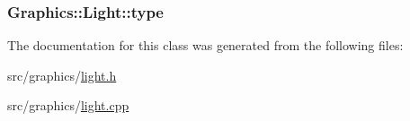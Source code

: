 \subsubsection[{type}]{ Graphics\+::\+Light\+::type\hspace{0.3cm}{\ttfamily [private]}}\label{class_graphics_1_1_light_a91b3331f89b6e025dfecfdc441a7080f}


The documentation for this class was generated from the following files\+:\begin{DoxyCompactItemize}
\item 
src/graphics/\hyperlink{light_8h}{light.\+h}\item 
src/graphics/\hyperlink{light_8cpp}{light.\+cpp}\end{DoxyCompactItemize}
